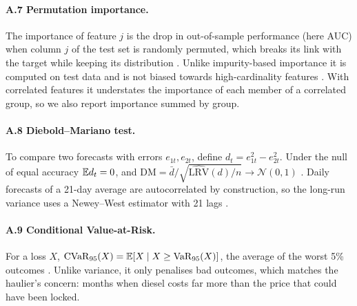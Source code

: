 \paragraph{A.7 Permutation importance.} The importance of feature $j$ is the drop in out-of-sample
performance (here AUC) when column $j$ of the test set is randomly permuted, which breaks its link with the
target while keeping its distribution \citep{fisher2019}. Unlike impurity-based importance it is computed
on test data and is not biased towards high-cardinality features \citep{strobl2007}. With correlated
features it understates the importance of each member of a correlated group, so we also report importance
summed by group.

\paragraph{A.8 Diebold--Mariano test.} To compare two forecasts with errors $e_{1t},e_{2t}$, define
$d_t=e_{1t}^2-e_{2t}^2$. Under the null of equal accuracy $\mathbb{E} d_t=0$, and
$\mathrm{DM}=\bar d/\sqrt{\widehat{\mathrm{LRV}}(d)/n}\to\mathcal N(0,1)$ \citep{diebold1995}. Daily forecasts of a
21-day average are autocorrelated by construction, so the long-run variance uses a Newey--West estimator
with 21 lags \citep{newey1987}.

\paragraph{A.9 Conditional Value-at-Risk.} For a loss $X$, $\mathrm{CVaR}_{95}(X)=\mathbb{E}[X\mid X\ge
\mathrm{VaR}_{95}(X)]$, the average of the worst 5\% outcomes \citep{rockafellar2000}. Unlike variance, it
only penalises bad outcomes, which matches the haulier's concern: months when diesel costs far more than
the price that could have been locked.
